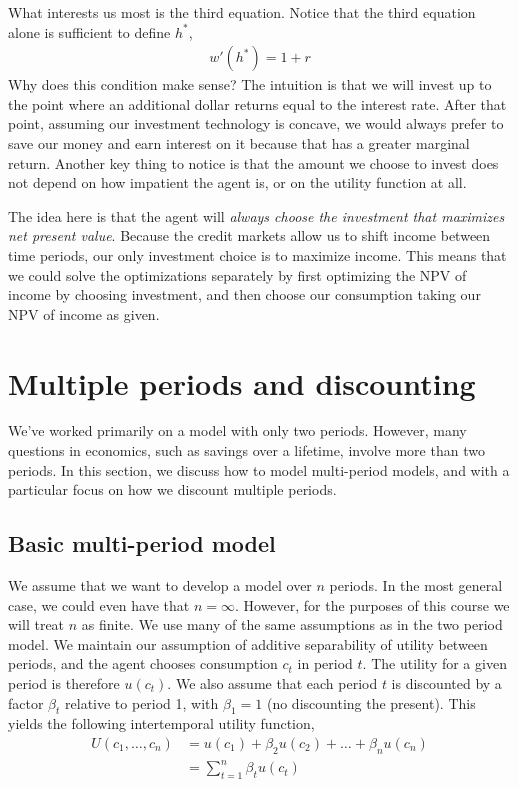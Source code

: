 What interests us most is the third equation. Notice that the third equation alone is sufficient to define $h^*$, 
\begin{align*}
    w'(h^*) = 1 + r
\end{align*}
Why does this condition make sense? The intuition is that we will invest up to the point where an additional dollar returns equal to the interest rate. After that point, assuming our investment technology is concave, we would always prefer to save our money and earn interest on it because that has a greater marginal return. Another key thing to notice is that the amount we choose to invest does not depend on how impatient the agent is, or on the utility function at all. 

The idea here is that the agent will \emph{always choose the investment that maximizes net present value}. Because the credit markets allow us to shift income between time periods, our only investment choice is to maximize income. This means that we could solve the optimizations separately by first optimizing the NPV of income by choosing investment, and then choose our consumption taking our NPV of income as given.

\section{Multiple periods and discounting}
We've worked primarily on a model with only two periods. However, many questions in economics, such as savings over a lifetime, involve more than two periods. In this section, we discuss how to model multi-period models, and with a particular focus on how we discount multiple periods.

\subsection*{Basic multi-period model}
We assume that we want to develop a model over $n$ periods. In the most general case, we could even have that $n = \infty$. However, for the purposes of this course we will treat $n$ as finite. We use many of the same assumptions as in the two period model. We maintain our assumption of additive separability of utility between periods, and the agent chooses consumption $c_t$ in period $t$. The utility for a given period is therefore $u(c_t)$. We also assume that each period $t$ is discounted by a factor $\beta_t$ relative to period 1, with $\beta_1 = 1$ (no discounting the present). This yields the following intertemporal utility function,
\begin{align*}
    U(c_1, \dots, c_n) &= u(c_1) + \beta_2 u(c_2) + \dots + \beta_n u(c_n) \\
    &= \sum_{t = 1}^n \beta_t u(c_t)
\end{align*}

